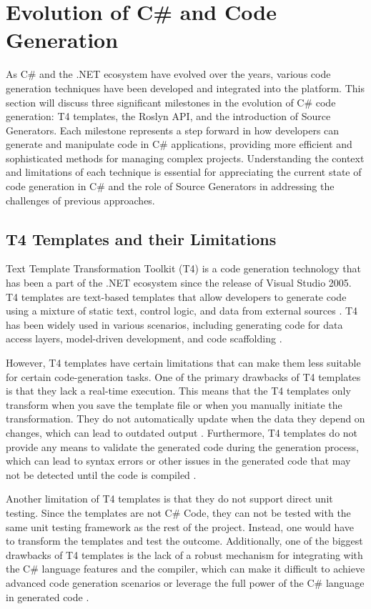 \section{Evolution of C\# and Code Generation}

As C\# and the .NET ecosystem have evolved over the years, various code generation techniques have been developed and integrated into the platform. This section will discuss three significant milestones in the evolution of C\# code generation: T4 templates, the Roslyn API, and the introduction of Source Generators. Each milestone represents a step forward in how developers can generate and manipulate code in C\# applications, providing more efficient and sophisticated methods for managing complex projects. Understanding the context and limitations of each technique is essential for appreciating the current state of code generation in C\# and the role of Source Generators in addressing the challenges of previous approaches.

\subsection{T4 Templates and their Limitations}

Text Template Transformation Toolkit (T4) is a code generation technology that has been a part of the .NET ecosystem since the release of Visual Studio 2005. T4 templates are text-based templates that allow developers to generate code using a mixture of static text, control logic, and data from external sources \cite{Klein2010}. T4 has been widely used in various scenarios, including generating code for data access layers, model-driven development, and code scaffolding \cite{Vogel2010}.

However, T4 templates have certain limitations that can make them less suitable for certain code-generation tasks. One of the primary drawbacks of T4 templates is that they lack a real-time execution. This means that the T4 templates only transform when you save the template file or when you manually initiate the transformation. They do not automatically update when the data they depend on changes, which can lead to outdated output \cite{Klein2010}. Furthermore, T4 templates do not provide any means to validate the generated code during the generation process, which can lead to syntax errors or other issues in the generated code that may not be detected until the code is compiled \cite{Vogel2010}.

Another limitation of T4 templates is that they do not support direct unit testing. Since the templates are not C\# Code, they can not be tested with the same unit testing framework as the rest of the project. Instead, one would have to transform the templates and test the outcome. Additionally, one of the biggest drawbacks of T4 templates is the lack of a robust mechanism for integrating with the C\# language features and the compiler, which can make it difficult to achieve advanced code generation scenarios or leverage the full power of the C\# language in generated code \cite{Esposito2014}.

